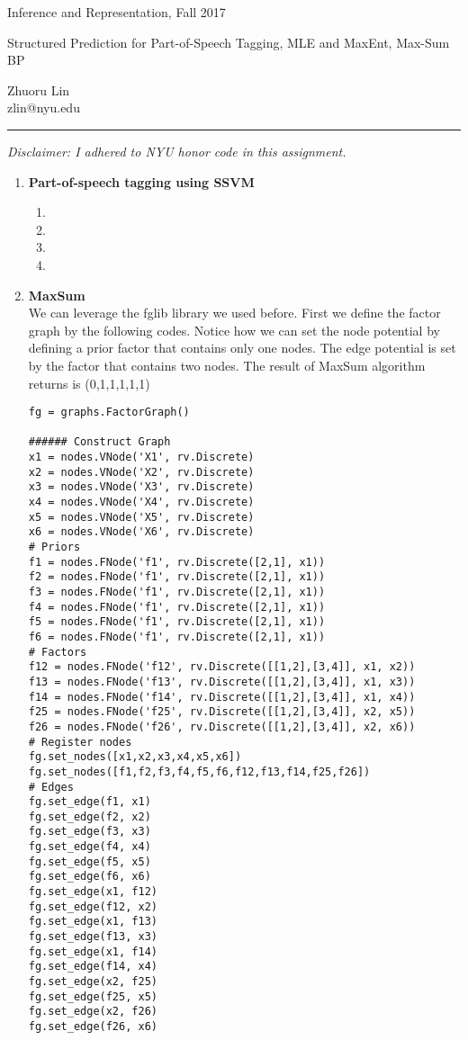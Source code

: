 \documentclass{article}
\newcommand{\ruleskip}{\bigskip\hrule\bigskip}
\begin{document}
\pagestyle{myheadings} 

{\LARGE
\begin{center}Inference and Representation, Fall 2017\end{center}
}

{\Large
Structured Prediction for Part-of-Speech Tagging,
MLE and MaxEnt, Max-Sum BP
}
\begin{center}
Zhuoru Lin\\
zlin@nyu.edu
\end{center}


\ruleskip 
{\em Disclaimer: 
I adhered to NYU honor code in this assignment. }

\begin{enumerate}
\item \textbf{Part-of-speech tagging using SSVM}
\begin{enumerate}
\item 

\item 
\item 
\item
\end{enumerate}
\pagebreak
\item \textbf{MaxSum}
\\
We can leverage the fglib library we used before. First we define the factor graph by the following codes. Notice how we can set the node potential by defining a prior factor that contains only one nodes. The edge potential is set by the factor that contains two nodes. The result of MaxSum algorithm returns is (0,1,1,1,1,1)

\begin{verbatim}
fg = graphs.FactorGraph()

###### Construct Graph
x1 = nodes.VNode('X1', rv.Discrete)
x2 = nodes.VNode('X2', rv.Discrete)
x3 = nodes.VNode('X3', rv.Discrete)
x4 = nodes.VNode('X4', rv.Discrete)
x5 = nodes.VNode('X5', rv.Discrete)
x6 = nodes.VNode('X6', rv.Discrete)
# Priors 
f1 = nodes.FNode('f1', rv.Discrete([2,1], x1))
f2 = nodes.FNode('f1', rv.Discrete([2,1], x1))
f3 = nodes.FNode('f1', rv.Discrete([2,1], x1))
f4 = nodes.FNode('f1', rv.Discrete([2,1], x1))
f5 = nodes.FNode('f1', rv.Discrete([2,1], x1))
f6 = nodes.FNode('f1', rv.Discrete([2,1], x1))
# Factors
f12 = nodes.FNode('f12', rv.Discrete([[1,2],[3,4]], x1, x2))
f13 = nodes.FNode('f13', rv.Discrete([[1,2],[3,4]], x1, x3))
f14 = nodes.FNode('f14', rv.Discrete([[1,2],[3,4]], x1, x4))
f25 = nodes.FNode('f25', rv.Discrete([[1,2],[3,4]], x2, x5))
f26 = nodes.FNode('f26', rv.Discrete([[1,2],[3,4]], x2, x6))
# Register nodes
fg.set_nodes([x1,x2,x3,x4,x5,x6])
fg.set_nodes([f1,f2,f3,f4,f5,f6,f12,f13,f14,f25,f26])
# Edges
fg.set_edge(f1, x1)
fg.set_edge(f2, x2)
fg.set_edge(f3, x3)
fg.set_edge(f4, x4)
fg.set_edge(f5, x5)
fg.set_edge(f6, x6)
fg.set_edge(x1, f12)
fg.set_edge(f12, x2)
fg.set_edge(x1, f13)
fg.set_edge(f13, x3)
fg.set_edge(x1, f14)
fg.set_edge(f14, x4)
fg.set_edge(x2, f25)
fg.set_edge(f25, x5)
fg.set_edge(x2, f26)
fg.set_edge(f26, x6)
\end{verbatim}


\end{enumerate}
\end{document}
